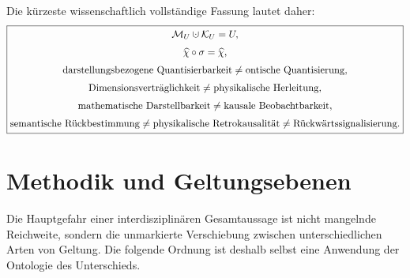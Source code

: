 \documentclass[11pt,a4paper]{article}
\theoremstyle{remark}
\newcommand{\M}{\mathcal{M}}
\newcommand{\K}{\mathcal{K}}
\newcommand{\dotcup}{\mathbin{\mathaccent\cdot\cup}}
\begin{document}
Die kürzeste wissenschaftlich vollständige Fassung lautet daher:
\[
\boxed{
\begin{gathered}
\M_U\dotcup\K_U=U,\\[0.3em]
\widehat\chi\circ\sigma=\widehat\chi,\\[0.3em]
\text{darstellungsbezogene Quantisierbarkeit}
\neq
\text{ontische Quantisierung},\\[0.3em]
\text{Dimensionsverträglichkeit}
\neq
\text{physikalische Herleitung},\\[0.3em]
\text{mathematische Darstellbarkeit}
\neq
\text{kausale Beobachtbarkeit},\\[0.3em]
\text{semantische Rückbestimmung}
\neq
\text{physikalische Retrokausalität}
\neq
\text{Rückwärtssignalisierung}.
\end{gathered}}
\]

\section{Methodik und Geltungsebenen}

Die Hauptgefahr einer interdisziplinären Gesamtaussage ist nicht mangelnde
Reichweite, sondern die unmarkierte Verschiebung zwischen unterschiedlichen
Arten von Geltung. Die folgende Ordnung ist deshalb selbst eine Anwendung der
Ontologie des Unterschieds.
\end{document}
